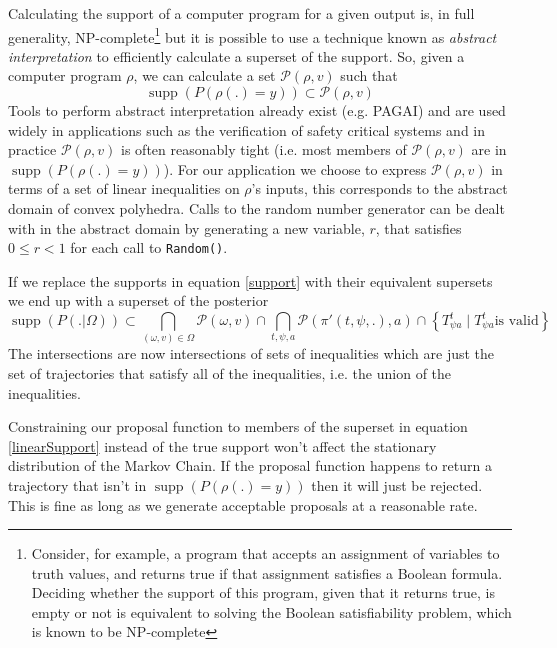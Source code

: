 \documentclass{article}
\DeclareMathOperator\supp{supp}
\begin{document}
Calculating the support of a computer program for a given output is, in full generality, NP-complete\footnote{Consider, for example, a program that accepts an assignment of variables to truth values, and returns true if that assignment satisfies a Boolean formula. Deciding whether the support of this program, given that it returns true, is empty or not is equivalent to solving the Boolean satisfiability problem, which is known to be NP-complete\cite{cook1971complexity}} but it is possible to use a technique known as \textit{abstract interpretation}\cite{cousot1977abstract} to efficiently calculate a superset of the support. So, given a computer program $\rho$, we can calculate a set $\mathcal{P}(\rho, v)$ such that
\[
\supp(P(\rho(.)=y)) \subset \mathcal{P}(\rho, v)
\]
Tools to perform abstract interpretation already exist (e.g. PAGAI\cite{henry2012pagai}) and are used widely in applications such as the verification of safety critical systems\cite{blanchet2003static} and in practice $\mathcal{P}(\rho, v)$ is often reasonably tight (i.e. most members of $\mathcal{P}(\rho, v)$ are in $\supp(P(\rho(.)=y))$). For our application we choose to express $\mathcal{P}(\rho, v)$ in terms of a set of linear inequalities on $\rho$'s inputs, this corresponds to the abstract domain of convex polyhedra\cite{cousot1978automatic}\cite{becchi2018efficient}. Calls to the random number generator can be dealt with in the abstract domain by generating a new variable, $r$, that satisfies $0 \le r < 1$ for each call to \texttt{Random()}.

If we replace the supports in equation \ref{support} with their equivalent supersets we end up with a superset of the posterior
\begin{equation}
\supp(P(.|\Omega)) \subset
\bigcap_{(\omega,v) \in \Omega}  \mathcal{P}(\omega, v) \cap
\bigcap_{t, \psi, a} \mathcal{P}(\pi'(t,\psi,.), a) \cap
\left\{T^t_{\psi a} \mid T^t_{\psi a} \text{is valid}\right\}
\label{linearSupport}
\end{equation}
The intersections are now intersections of sets of inequalities which are just the set of trajectories that satisfy all of the inequalities, i.e. the union of the inequalities.

Constraining our proposal function to members of the superset in equation \ref{linearSupport} instead of the true support won't affect the stationary distribution of the Markov Chain. If the proposal function happens to return a trajectory that isn't in $\supp(P(\rho(.)=y))$ then it will just be rejected. This is fine as long as we generate acceptable proposals at a reasonable rate.
\end{document}
